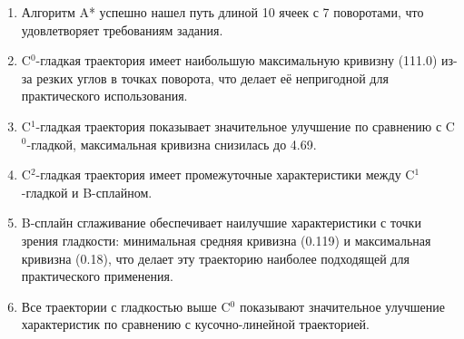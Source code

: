 \begin{enumerate}
\item Алгоритм A* успешно нашел путь длиной 10 ячеек с 7 поворотами, что удовлетворяет требованиям задания.

\item C$^0$-гладкая траектория имеет наибольшую максимальную кривизну (111.0) из-за резких углов в точках поворота, что делает её непригодной для практического использования.

\item C$^1$-гладкая траектория показывает значительное улучшение по сравнению с C$^0$-гладкой, максимальная кривизна снизилась до 4.69.

\item C$^2$-гладкая траектория имеет промежуточные характеристики между C$^1$-гладкой и B-сплайном.

\item B-сплайн сглаживание обеспечивает наилучшие характеристики с точки зрения гладкости: минимальная средняя кривизна (0.119) и максимальная кривизна (0.18), что делает эту траекторию наиболее подходящей для практического применения.

\item Все траектории с гладкостью выше C$^0$ показывают значительное улучшение характеристик по сравнению с кусочно-линейной траекторией.
\end{enumerate}

